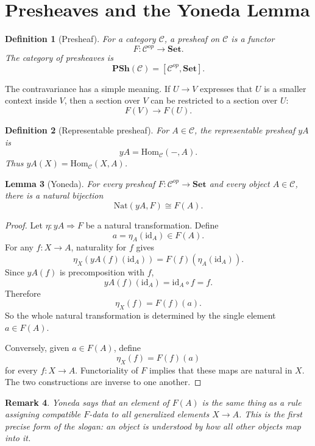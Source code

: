 \documentclass[11pt]{article}
\newtheorem{definition}{Definition}[section]
\newtheorem{lemma}[definition]{Lemma}
\newtheorem{remark}[definition]{Remark}
\newcommand{\Set}{\mathbf{Set}}
\newcommand{\PSh}{\mathbf{PSh}}
\newcommand{\Hom}{\mathrm{Hom}}
\newcommand{\Nat}{\mathrm{Nat}}
\newcommand{\id}{\mathrm{id}}
\begin{document}
\section{Presheaves and the Yoneda Lemma}

\begin{definition}[Presheaf]
For a category \(\mathcal C\), a presheaf on \(\mathcal C\) is a functor
\[
F:\mathcal C^{op}\longrightarrow \Set.
\]
The category of presheaves is
\[
\PSh(\mathcal C)=[\mathcal C^{op},\Set].
\]
\end{definition}

The contravariance has a simple meaning. If \(U\to V\) expresses that \(U\) is a
smaller context inside \(V\), then a section over \(V\) can be restricted to a
section over \(U\):
\[
F(V)\longrightarrow F(U).
\]

\begin{definition}[Representable presheaf]
For \(A\in\mathcal C\), the representable presheaf \(yA\) is
\[
yA=\Hom_{\mathcal C}(-,A).
\]
Thus \(yA(X)=\Hom_{\mathcal C}(X,A)\).
\end{definition}

\begin{lemma}[Yoneda]
For every presheaf \(F:\mathcal C^{op}\to\Set\) and every object
\(A\in\mathcal C\), there is a natural bijection
\[
\Nat(yA,F)\cong F(A).
\]
\end{lemma}

\begin{proof}
Let \(\eta:yA\Rightarrow F\) be a natural transformation. Define
\[
a=\eta_A(\id_A)\in F(A).
\]
For any \(f:X\to A\), naturality for \(f\) gives
\[
\eta_X(yA(f)(\id_A))=F(f)(\eta_A(\id_A)).
\]
Since \(yA(f)\) is precomposition with \(f\),
\[
yA(f)(\id_A)=\id_A\circ f=f.
\]
Therefore
\[
\eta_X(f)=F(f)(a).
\]
So the whole natural transformation is determined by the single element
\(a\in F(A)\).

Conversely, given \(a\in F(A)\), define
\[
\eta_X(f)=F(f)(a)
\]
for every \(f:X\to A\). Functoriality of \(F\) implies that these maps are
natural in \(X\). The two constructions are inverse to one another.
\end{proof}

\begin{remark}
Yoneda says that an element of \(F(A)\) is the same thing as a rule assigning
compatible \(F\)-data to all generalized elements \(X\to A\). This is the first
precise form of the slogan: an object is understood by how all other objects
map into it.
\end{remark}
\end{document}
